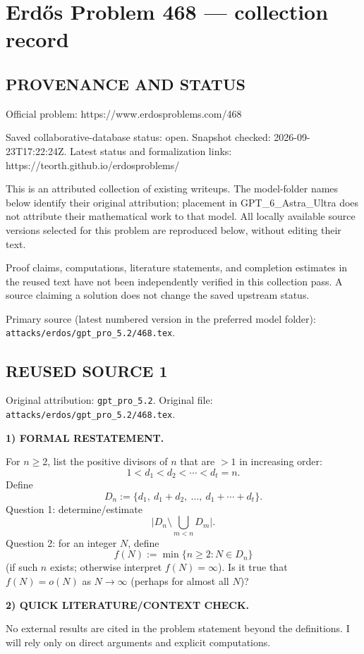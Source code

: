 \section*{Erd\H{o}s Problem 468 --- collection record}

\subsection*{PROVENANCE AND STATUS}
Official problem: https://www.erdosproblems.com/468

Saved collaborative-database status: open.
Snapshot checked: 2026-09-23T17:22:24Z.
Latest status and formalization links: https://teorth.github.io/erdosproblems/

This is an attributed collection of existing writeups. The model-folder names below identify their original attribution; placement in GPT\_6\_Astra\_Ultra does not attribute their mathematical work to that model. All locally available source versions selected for this problem are reproduced below, without editing their text.

Proof claims, computations, literature statements, and completion estimates in the reused text have not been independently verified in this collection pass. A source claiming a solution does not change the saved upstream status.

Primary source (latest numbered version in the preferred model folder): \texttt{attacks/erdos/gpt\_pro\_5.2/468.tex}.

\subsection*{REUSED SOURCE 1}
Original attribution: \texttt{gpt\_pro\_5.2}.
Original file: \texttt{attacks/erdos/gpt\_pro\_5.2/468.tex}.


\noindent\textbf{1) FORMAL RESTATEMENT.}

For $n\ge 2$, list the positive divisors of $n$ that are $>1$ in increasing order:
\[
1<d_1<d_2<\cdots<d_t=n.
\]
Define
\[
D_n:=\{d_1,\ d_1+d_2,\ \dots,\ d_1+\cdots+d_t\}.
\]
Question 1: determine/estimate
\[
\bigl|D_n\setminus \bigcup_{m<n} D_m\bigr|.
\]
Question 2: for an integer $N$, define
\[
f(N):=\min\{n\ge 2: N\in D_n\}
\]
(if such $n$ exists; otherwise interpret $f(N)=\infty$). Is it true that $f(N)=o(N)$ as $N\to\infty$ (perhaps for almost all $N$)?

\medskip
\noindent\textbf{2) QUICK LITERATURE/CONTEXT CHECK.}

No external results are cited in the problem statement beyond the definitions. I will rely only on direct arguments and explicit computations.

